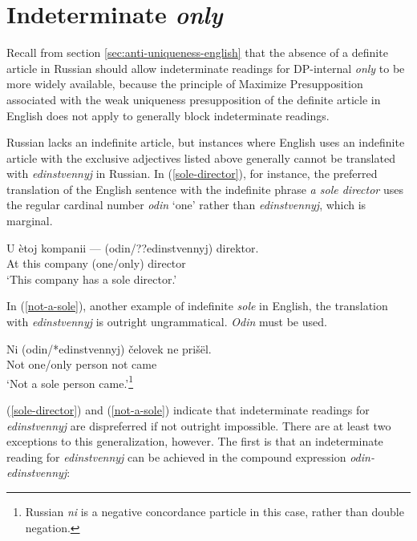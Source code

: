 \section{Indeterminate \textit{only} \label{sec:indeterminate-only}}
Recall from section \ref{sec:anti-uniqueness-english} that the absence of a definite article in Russian should allow indeterminate readings for DP-internal \textit{only} to be more widely available, because the principle of Maximize Presupposition associated with the weak uniqueness presupposition of the definite article in English does not apply to generally block indeterminate readings.

Russian lacks an indefinite article, but instances where English uses an indefinite article with the exclusive adjectives listed above generally cannot be translated with \textit{edinstvennyj} in Russian. In (\ref{sole-director}), for instance, the preferred translation of the English sentence with the indefinite phrase \textit{a sole director} uses the regular cardinal number \textit{odin} `one' rather than \textit{edinstvennyj}, which is marginal.

\begin{exe}
	\ex \label{sole-director} \gll U \`{e}toj kompanii --- (odin/??edinstvennyj) direktor.\\
	At this company {} (one/only) director\\
	\glt `This company has a sole director.'
\end{exe}

In (\ref{not-a-sole}), another example of indefinite \textit{sole} in English, the translation with \textit{edinstvennyj} is outright ungrammatical. \textit{Odin} must be used.

\begin{exe}
	\ex \label{not-a-sole} \gll Ni (odin/*edinstvennyj) \v{c}elovek ne pri\v{s}\"{e}l.\\
	Not one/only person not came\\
	\glt `Not a sole person came.'\footnote{Russian \textit{ni} is a negative concordance particle in this case, rather than double negation.}
\end{exe}

(\ref{sole-director}) and (\ref{not-a-sole}) indicate that indeterminate readings for \textit{edinstvennyj} are dispreferred if not outright impossible. There are at least two exceptions to this generalization, however. The first is that an indeterminate reading for \textit{edinstvennyj} can be achieved in the compound expression \textit{odin-edinstvennyj}:

